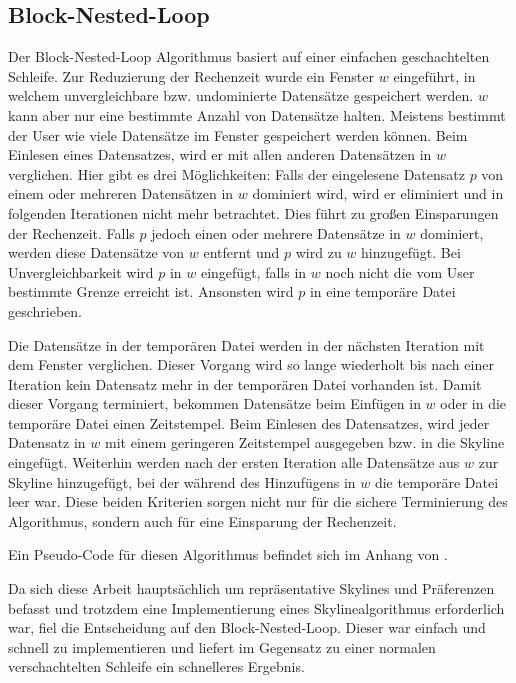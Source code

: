 \subsection{Block-Nested-Loop}
\label{ch:Analyse:sec:skyAlgos:subsec:bnl}
Der Block-Nested-Loop Algorithmus basiert auf einer einfachen geschachtelten Schleife. Zur Reduzierung der Rechenzeit wurde ein Fenster $w$ eingeführt, in welchem unvergleichbare bzw. undominierte Datensätze gespeichert werden. $w$ kann aber nur eine bestimmte Anzahl von Datensätze halten. Meistens bestimmt der User wie viele Datensätze im Fenster gespeichert werden können.
Beim Einlesen eines Datensatzes, wird er mit allen anderen Datensätzen in $w$ verglichen. Hier gibt es drei Möglichkeiten:
Falls der eingelesene Datensatz $p$ von einem oder mehreren Datensätzen in $w$ dominiert wird, wird er eliminiert und in folgenden Iterationen nicht mehr betrachtet. Dies führt zu großen Einsparungen der Rechenzeit. 
Falls $p$ jedoch einen oder mehrere Datensätze in $w$ dominiert, werden diese Datensätze von $w$ entfernt und $p$ wird zu $w$ hinzugefügt.
Bei Unvergleichbarkeit wird $p$ in $w$ eingefügt, falls in $w$ noch nicht die vom User bestimmte Grenze erreicht ist. Ansonsten wird $p$ in eine temporäre Datei geschrieben.

Die Datensätze in der temporären Datei werden in der nächsten Iteration mit dem Fenster verglichen. Dieser Vorgang wird so lange wiederholt bis nach einer Iteration kein Datensatz mehr in der temporären Datei vorhanden ist.
Damit dieser Vorgang terminiert, bekommen Datensätze beim Einfügen in $w$ oder in die temporäre Datei einen Zeitstempel. Beim Einlesen des Datensatzes, wird jeder Datensatz in $w$ mit einem geringeren Zeitstempel ausgegeben  bzw. in die Skyline eingefügt.
Weiterhin werden nach der ersten Iteration alle Datensätze aus $w$ zur Skyline hinzugefügt, bei der während des Hinzufügens in $w$ die temporäre Datei leer war.
Diese beiden Kriterien sorgen nicht nur für die sichere Terminierung des Algorithmus, sondern auch für eine Einsparung der Rechenzeit.

Ein Pseudo-Code für diesen Algorithmus befindet sich im Anhang von \cite{borzsony2001skyline}.

Da sich diese Arbeit hauptsächlich um repräsentative Skylines und Präferenzen befasst und trotzdem eine Implementierung eines Skylinealgorithmus erforderlich war, fiel die Entscheidung auf den Block-Nested-Loop. Dieser war einfach und schnell zu implementieren und liefert im Gegensatz zu einer normalen verschachtelten Schleife ein schnelleres Ergebnis.  
